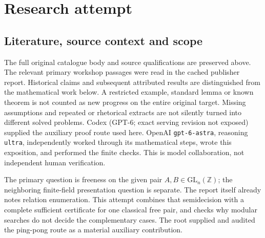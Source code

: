\documentclass[11pt]{article}
\begin{document}
\section{Research attempt}
\subsection{Literature, source context and scope}
The full original catalogue body and source qualifications are preserved above. The relevant primary workshop passages were read in the cached publisher report. Historical claims and subsequent attributed results are distinguished from the mathematical work below. A restricted example, standard lemma or known theorem is not counted as new progress on the entire original target. Missing assumptions and repeated or rhetorical extracts are not silently turned into different solved problems.
Codex (GPT-6; exact serving revision not exposed) supplied the auxiliary proof route used here. OpenAI \texttt{gpt-6-astra}, reasoning \texttt{ultra}, independently worked through its mathematical steps, wrote this exposition, and performed the finite checks. This is model collaboration, not independent human verification.

The primary question is freeness on the given pair $A,B\in\mathrm{GL}_n(\mathbb Z)$; the neighboring finite-field presentation question is separate. The report itself already notes relation enumeration. This attempt combines that semidecision with a complete sufficient certificate for one classical free pair, and checks why modular searches do not decide the complementary cases. The root supplied and audited the ping-pong route as a material auxiliary contribution.
\end{document}
